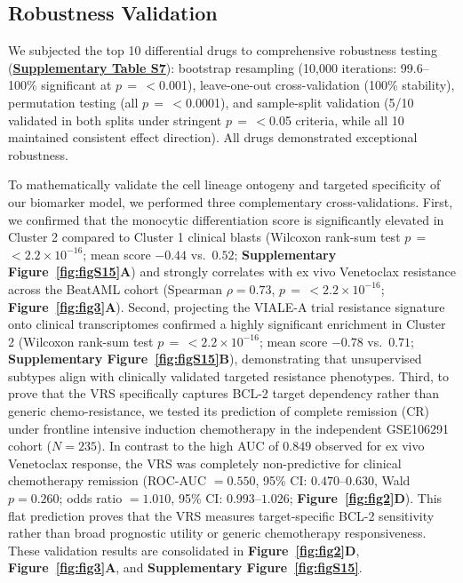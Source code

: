 \documentclass[11pt,a4paper]{article}
\newcommand{\pval}[1]{$p$\,$=$\,#1}
\begin{document}
\subsection{Robustness Validation} \label{sec:robustness_validation}

We subjected the top 10 differential drugs to comprehensive robustness testing (\href{Supplementary_Methods.pdf#tab:tabS7}{\textbf{Supplementary Table S7}}): bootstrap resampling (10,000 iterations: 99.6--100\% significant at \pval{$<$0.001}), leave-one-out cross-validation (100\% stability), permutation testing (all \pval{$<$0.0001}), and sample-split validation (5/10 validated in both splits under stringent \pval{$<$0.05} criteria, while all 10 maintained consistent effect direction). All drugs demonstrated exceptional robustness.

To mathematically validate the cell lineage ontogeny and targeted specificity of our biomarker model, we performed three complementary cross-validations. First, we confirmed that the monocytic differentiation score is significantly elevated in Cluster 2 compared to Cluster 1 clinical blasts (Wilcoxon rank-sum test \pval{$< 2.2 \times 10^{-16}$}; mean score $-0.44$ vs.\ $0.52$; \textbf{Supplementary Figure~\ref{fig:figS15}A}) and strongly correlates with ex vivo Venetoclax resistance across the BeatAML cohort (Spearman $\rho = 0.73$, \pval{$< 2.2 \times 10^{-16}$}; \textbf{Figure~\ref{fig:fig3}A}). Second, projecting the VIALE-A trial resistance signature onto clinical transcriptomes confirmed a highly significant enrichment in Cluster 2 (Wilcoxon rank-sum test \pval{$< 2.2 \times 10^{-16}$}; mean score $-0.78$ vs.\ $0.71$; \textbf{Supplementary Figure~\ref{fig:figS15}B}), demonstrating that unsupervised subtypes align with clinically validated targeted resistance phenotypes. Third, to prove that the VRS specifically captures BCL-2 target dependency rather than generic chemo-resistance, we tested its prediction of complete remission (CR) under frontline intensive induction chemotherapy in the independent GSE106291 cohort ($N=235$). In contrast to the high AUC of $0.849$ observed for ex vivo Venetoclax response, the VRS was completely non-predictive for clinical chemotherapy remission (ROC-AUC $= 0.550$, 95\% CI: $0.470$--$0.630$, Wald $p = 0.260$; odds ratio $= 1.010$, 95\% CI: $0.993$--$1.026$; \textbf{Figure~\ref{fig:fig2}D}). This flat prediction proves that the VRS measures target-specific BCL-2 sensitivity rather than broad prognostic utility or generic chemotherapy responsiveness. These validation results are consolidated in \textbf{Figure~\ref{fig:fig2}D}, \textbf{Figure~\ref{fig:fig3}A}, and \textbf{Supplementary Figure~\ref{fig:figS15}}.
\end{document}
